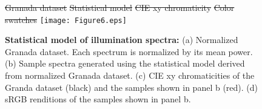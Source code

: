 \documentclass{jov}
\providecommand{\DIFdeltex}[1]{{\protect\color{red}\sout{#1}}}                      %
\providecommand{\DIFdelFL}[1]{\DIFdel{#1}} %
\providecommand{\DIFaddbeginFL}{} %
\providecommand{\DIFaddendFL}{} %
\providecommand{\DIFdelbeginFL}{} %
\providecommand{\DIFdelendFL}{} %
\providecommand{\DIFdel}[1]{\texorpdfstring{\DIFdeltex{#1}}{}} %
\newcommand{\DIFscaledelfig}{0.5}
\newlength{\DIFdelgraphicswidth} %
\newlength{\DIFdelgraphicsheight} %
\newcommand{\DIFaddincludegraphics}[2][]{{\color{blue}\fbox{\DIFOincludegraphics[#1]{#2}}}} %
\newcommand{\DIFdelincludegraphics}[2][]{%
\sbox{\DIFdelgraphicsbox}{\DIFOincludegraphics[#1]{#2}}%
\settoboxwidth{\DIFdelgraphicswidth}{\DIFdelgraphicsbox} %
\settoboxtotalheight{\DIFdelgraphicsheight}{\DIFdelgraphicsbox} %
\scalebox{\DIFscaledelfig}{%
\parbox[b]{\DIFdelgraphicswidth}{\usebox{\DIFdelgraphicsbox}\\[-\baselineskip] \rule{\DIFdelgraphicswidth}{0em}}\llap{\resizebox{\DIFdelgraphicswidth}{\DIFdelgraphicsheight}{%
\setlength{\unitlength}{\DIFdelgraphicswidth}%
\begin{picture}(1,1)%
\thicklines\linethickness{2pt} %
{\color[rgb]{1,0,0}\put(0,0){\framebox(1,1){}}}%
{\color[rgb]{1,0,0}\put(0,0){\line( 1,1){1}}}%
{\color[rgb]{1,0,0}\put(0,1){\line(1,-1){1}}}%
\end{picture}%
}\hspace*{3pt}}} %
} %
\DeclareRobustCommand{\DIFaddbeginFL}{\DIFOaddbeginFL \let\includegraphics\DIFaddincludegraphics} %
\DeclareRobustCommand{\DIFaddendFL}{\DIFOaddendFL \let\includegraphics\DIFOincludegraphics} %
\DeclareRobustCommand{\DIFdelbeginFL}{\DIFOdelbeginFL \let\includegraphics\DIFdelincludegraphics} %
\DeclareRobustCommand{\DIFdelendFL}{\DIFOaddendFL \let\includegraphics\DIFOincludegraphics} %
\begin{document}
\begin{figure}
\centering
\DIFdelbeginFL %
{%
\DIFdelFL{Granada dataset}}
{%
\DIFdelFL{Statistical model}}
{%
\DIFdelFL{CIE xy chromaticity}}
{%
\DIFdelFL{Color swatches}}
\DIFdelendFL \DIFaddbeginFL \texttt{[image: Figure6.eps]}
    \DIFaddendFL \caption{{\bf Statistical model of illumination spectra:} (a) Normalized Granada dataset. Each spectrum is normalized by its mean power. (b) Sample spectra generated using the statistical model derived from normalized Granada dataset. (c) CIE xy chromaticities of the Granda dataset (black) and the samples shown in panel b (red). (d) sRGB renditions of the samples shown in panel b.}
\label{fig:illuminant}
\end{figure}
\end{document}
